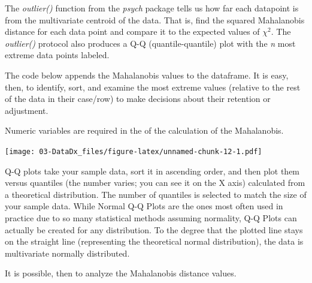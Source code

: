 \documentclass[
  11pt,
]{book}
\newenvironment{Shaded}{\begin{snugshade}}{\end{snugshade}}
\newcommand{\FunctionTok}[1]{\textcolor[rgb]{0.27,0.27,0.27}{\textbf{#1}}}
\newcommand{\NormalTok}[1]{#1}
\newcommand{\OtherTok}[1]{\textcolor[rgb]{0.37,0.37,0.37}{#1}}
\newcommand{\SpecialCharTok}[1]{\textcolor[rgb]{0.43,0.43,0.43}{\textbf{#1}}}
\newcommand{\StringTok}[1]{\textcolor[rgb]{0.5,0.5,0.5}{#1}}
\begin{document}
The \emph{outlier()} function from the \emph{psych} package tells us how far each datapoint is from the multivariate centroid of the data. That is, find the squared Mahalanobis distance for each data point and compare it to the expected values of \(\chi^2\). The \emph{outlier()} protocol also produces a Q-Q (quantile-quantile) plot with the \emph{n} most extreme data points labeled.

The code below appends the Mahalanobis values to the dataframe. It is easy, then, to identify, sort, and examine the most extreme values (relative to the rest of the data in their case/row) to make decisions about their retention or adjustment.

Numeric variables are required in the of the calculation of the Mahalanobis.

\begin{Shaded}
\end{Shaded}

\texttt{[image: 03-DataDx\_files/figure-latex/unnamed-chunk-12-1.pdf]}

Q-Q plots take your sample data, sort it in ascending order, and then plot them versus quantiles (the number varies; you can see it on the X axis) calculated from a theoretical distribution. The number of quantiles is selected to match the size of your sample data. While Normal Q-Q Plots are the ones most often used in practice due to so many statistical methods assuming normality, Q-Q Plots can actually be created for any distribution. To the degree that the plotted line stays on the straight line (representing the theoretical normal distribution), the data is multivariate normally distributed.

It is possible, then to analyze the Mahalanobis distance values.

\begin{Shaded}
\end{Shaded}
\end{document}
